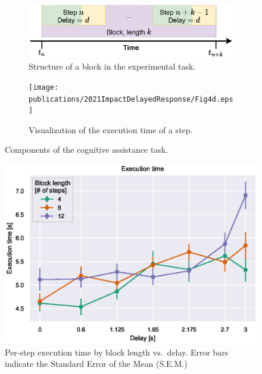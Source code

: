 \begin{figure}[h]
\begin{subfigure}[t]{.49\textwidth}
        \label{fig:cogassist:step:delay}
    \end{subfigure}
    \medskip%
    \begin{subfigure}[t]{.49\textwidth}
        \centering
        \includegraphics[width=\textwidth]{publications/2021ImpactDelayedResponse/Fig4c.eps}
        \caption{Structure of a block in the experimental task.}%
        \label{fig:cogassist:block}
    \end{subfigure}%
    \hfill%
    \begin{subfigure}[t]{.49\textwidth}
        \centering
        \texttt{[image: publications/2021ImpactDelayedResponse/Fig4d.eps]}
        \caption{Visualization of the execution time of a step.}%
        \label{fig:exectime:diagram}
    \end{subfigure}%
    \caption{Components of the cognitive assistance task.}
\end{figure}

\begin{figure}[h]
    \centering
    \includegraphics[width=.8\textwidth]{publications/2021ImpactDelayedResponse/Fig6.eps}
    \caption{Per-step execution time by block length vs.\ delay. Error bars indicate the Standard Error of the Mean (S.E.M.)}\label{fig:exectime}%
\end{figure}

